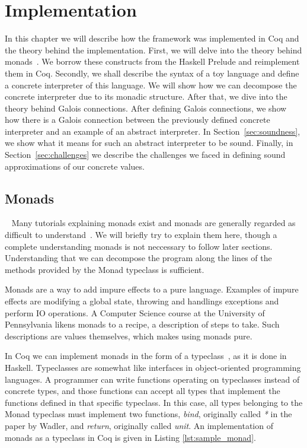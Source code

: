 \chapter{Implementation}
In this chapter we will describe how the framework was implemented in Coq and
the theory behind the implementation. First, we will delve into the theory
behind monads~\cite{wadler1995monads}. We borrow these constructs from the 
Haskell Prelude and reimplement them in Coq. Secondly, we shall describe the 
syntax of a toy language and define a concrete interpreter of this language. We
will show how we can decompose the concrete interpreter due to its monadic
structure. After that, we
dive into the theory behind Galois connections. After defining Galois
connections, we show how there is a Galois connection between the previously
defined concrete interpreter and an example of an abstract interpreter.
In Section~\ref{sec:soundness}, we show what it means for such an abstract
interpreter to be sound. Finally, in Section~\ref{sec:challenges} we describe
the challenges we faced in defining sound approximations of our concrete
values.

\section{Monads}~\label{sec:monads}
Many tutorials explaining monads exist and monads are generally regarded as
difficult to understand~\cite{petricek2018we}. We will briefly try to explain
them here, though a complete understanding monads is not neccessary to follow 
later sections. Understanding that we can decompose the program along the 
lines of the methods provided by the Monad typeclass is sufficient.

Monads are a way to add impure effects to a pure language. Examples of impure
effects are modifying a global state, throwing and handlings exceptions and
perform IO operations. A Computer Science course at the University of
Pennsylvania likens monads to a recipe, a description of steps to take. Such
descriptions are values themselves, which makes using monads pure.

In Coq we can implement monads in the form of a typeclass~\cite{sozeau2008first}, 
as it is done in Haskell. Typeclasses are somewhat like interfaces in 
object-oriented programming languages. A programmer can write functions 
operating on typeclasses instead of concrete types, and those functions can
accept all types that implement the functions defined in that specific typeclass. 
In this case, all types belonging to the Monad typeclass must implement two functions,
\textit{bind}, originally called \textit{*} in the paper by Wadler, and 
\textit{return}, originally called \textit{unit}. An implementation of monads
as a typeclass in Coq is given in Listing \ref{lst:sample_monad}.

